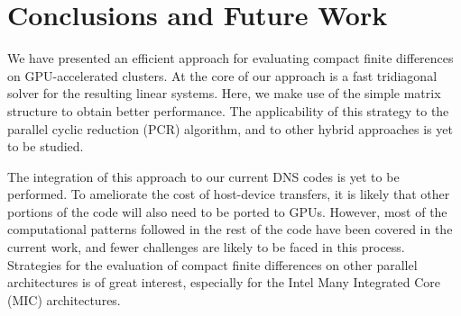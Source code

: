 \chapter{Conclusions and Future Work}

We have presented an efficient approach for evaluating
compact finite differences on GPU-accelerated clusters.
At the core of our approach is a
fast tridiagonal solver for the resulting linear systems.
Here, we make use of the simple matrix structure
to obtain better performance.
The applicability of this strategy to the
parallel cyclic reduction (PCR) algorithm,
and to other hybrid approaches is yet to be studied.

The integration of this approach to our
current DNS codes is yet to be performed.
To ameliorate the cost of host-device transfers,
it is likely that other portions of the code
will also need to be ported to GPUs.
However,
most of the computational patterns
followed in the rest of the code
have been covered in the current work,
and fewer challenges are likely to be faced
in this process.
Strategies for the evaluation of compact finite differences
on other parallel architectures is of great interest,
especially for the Intel Many Integrated Core (MIC)
architectures.
